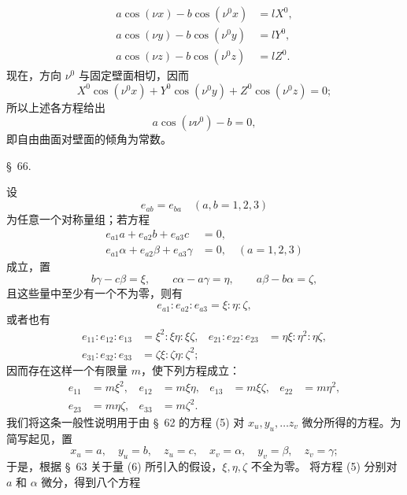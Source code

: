 \documentclass[11pt,a4paper,leqno]{article}
\begin{document}
\[
\begin{aligned}
a\cos(\nu x)-b\cos(\nu^0x)&=lX^0,\\
a\cos(\nu y)-b\cos(\nu^0y)&=lY^0,\\
a\cos(\nu z)-b\cos(\nu^0z)&=lZ^0.
\end{aligned}
\]
现在，方向 $\nu^0$ 与固定壁面相切，因而
\[
X^0\cos(\nu^0x)+Y^0\cos(\nu^0y)+Z^0\cos(\nu^0z)=0;
\]
所以上述各方程给出
\[
a\cos(\nu\nu^0)-b=0,
\]
即自由曲面对壁面的倾角为常数。

\begin{center}
{\large \S~66.}
\end{center}

设
\[
e_{ab}=e_{ba}\quad(a,b=1,2,3)
\]
为任意一个对称量组；若方程
\begin{equation}\tag{18}
\begin{aligned}
e_{a1}a+e_{a2}b+e_{a3}c&=0,\\
e_{a1}\alpha+e_{a2}\beta+e_{a3}\gamma&=0,\quad(a=1,2,3)
\end{aligned}
\end{equation}
成立，置
\[
b\gamma-c\beta=\xi,\qquad c\alpha-a\gamma=\eta,
\qquad a\beta-b\alpha=\zeta,
\]
且这些量中至少有一个不为零，则有
\[
e_{a1}:e_{a2}:e_{a3}=\xi:\eta:\zeta,
\]
或者也有
\[
\begin{aligned}
e_{11}:e_{12}:e_{13}&=\xi^2:\xi\eta:\xi\zeta,
&e_{21}:e_{22}:e_{23}&=\eta\xi:\eta^2:\eta\zeta,\\
e_{31}:e_{32}:e_{33}&=\zeta\xi:\zeta\eta:\zeta^2;
\end{aligned}
\]
因而存在这样一个有限量 $m$，使下列方程成立：
\[
\begin{aligned}
e_{11}&=m\xi^2,&e_{12}&=m\xi\eta,&e_{13}&=m\xi\zeta,&e_{22}&=m\eta^2,\\
e_{23}&=m\eta\zeta,&e_{33}&=m\zeta^2.
\end{aligned}
\]
我们将这条一般性说明用于由 \S~62 的方程 (5) 对 $x_u,y_u,\ldots z_v$
微分所得的方程。为简写起见，置
\[
x_u=a,\quad y_u=b,\quad z_u=c,\quad x_v=\alpha,\quad y_v=\beta,\quad z_v=\gamma;
\]
于是，根据 \S~63 关于量 (6) 所引入的假设，$\xi,\eta,\zeta$ 不全为零。
将方程 (5) 分别对 $a$ 和 $\alpha$ 微分，得到八个方程
\end{document}
